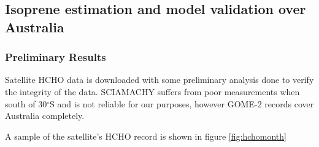 \subsection{Isoprene estimation and model validation over Australia}

\subsubsection{Preliminary Results}

Satellite HCHO data is downloaded with some preliminary analysis done to verify the integrity of the data.
SCIAMACHY suffers from poor measurements when south of 30$^{\circ}$S and is not reliable for our purposes, however GOME-2 records cover Australia completely. 

A sample of the satellite's HCHO record is shown in figure \ref{fig:hchomonth}